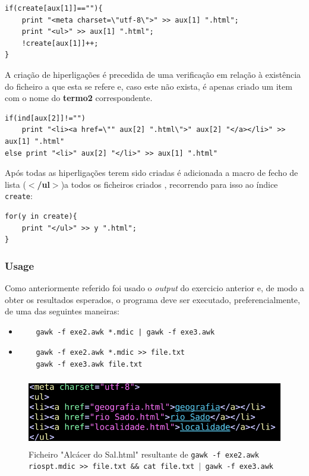 \documentclass{llncs}
\begin{document}
\begin{verbatim}
if(create[aux[1]]==""){
    print "<meta charset=\"utf-8\">" >> aux[1] ".html";
    print "<ul>" >> aux[1] ".html";
    !create[aux[1]]++;
}
\end{verbatim}

A criação de hiperligações é precedida de uma verificação em relação à existência do ficheiro a que esta se refere e, caso este não exista, é apenas criado um item com o nome do \textbf{termo2} correspondente.

\begin{verbatim}
if(ind[aux[2]]!="") 
    print "<li><a href=\"" aux[2] ".html\">" aux[2] "</a></li>" >> aux[1] ".html"
else print "<li>" aux[2] "</li>" >> aux[1] ".html"
\end{verbatim}

Após todas as hiperligações terem sido criadas é adicionada a macro de fecho de lista (\textbf{$<$/ul$>$})a todos os ficheiros criados , recorrendo para isso ao índice \texttt{create}:
\begin{verbatim}
for(y in create){
    print "</ul>" >> y ".html";
}
\end{verbatim}

\subsubsection{Usage}
Como anteriormente referido foi usado o \textit{output} do exercicio anterior e, de modo a obter os resultados esperados, o programa deve ser executado, preferencialmente, de uma das seguintes maneiras:
\begin{itemize}
    \item \begin{verbatim}
    gawk -f exe2.awk *.mdic | gawk -f exe3.awk
    \end{verbatim}
    \item \begin{verbatim}
    gawk -f exe2.awk *.mdic >> file.txt
    gawk -f exe3.awk file.txt
    \end{verbatim}
\end{itemize}

\begin{figure}[H]
    \centering
    \includegraphics[height=3cm]{Exe3Out.png}
    \caption{Ficheiro "Alcácer do Sal.html"  resultante de \texttt{gawk -f exe2.awk riospt.mdic >> file.txt \&\& cat file.txt $|$ gawk -f exe3.awk}}
\end{figure}
\end{document}
